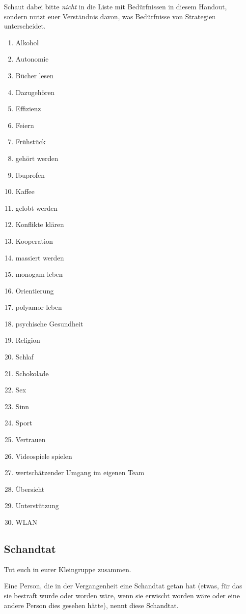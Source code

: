 Schaut dabei bitte \emph{nicht} in die Liste mit Bedürfnissen in diesem Handout, sondern nutzt euer Verständnis davon, was Bedürfnisse von Strategien unterscheidet.

\begin{enumerate}
  \item Alkohol
  \item Autonomie
  \item Bücher lesen
  \item Dazugehören
  \item Effizienz
  \item Feiern
  \item Frühstück
  \item gehört werden
  \item Ibuprofen
  \item Kaffee
  \item gelobt werden
  \item Konflikte klären
  \item Kooperation
  \item massiert werden
  \item monogam leben
  \item Orientierung
  \item polyamor leben
  \item psychische Gesundheit
  \item Religion
  \item Schlaf
  \item Schokolade
  \item Sex
  \item Sinn
  \item Sport
  \item Vertrauen
  \item Videospiele spielen
  \item wertschätzender Umgang im eigenen Team
  \item Übersicht
  \item Unterstützung
  \item WLAN
\end{enumerate}


\subsection{Schandtat}

Tut euch in eurer Kleingruppe zusammen.

Eine Person, die in der Vergangenheit eine \glqq Schandtat\grqq{} getan hat (etwas, für das sie bestraft wurde oder worden wäre, wenn sie erwischt worden wäre oder eine andere Person dies gesehen hätte), nennt diese Schandtat.

